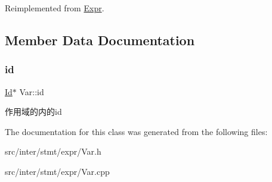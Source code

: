 Reimplemented from \hyperlink{class_expr}{Expr}.



\subsection{Member Data Documentation}
\mbox{\label{class_var_a3e5c7c9425da4659290da5c0553c7dc6}} 
\subsubsection{\texorpdfstring{id}{id}}
{\footnotesize\ttfamily \hyperlink{class_id}{Id}$\ast$ Var\+::id}

作用域的内的id 

The documentation for this class was generated from the following files\+:\begin{DoxyCompactItemize}
\item 
src/inter/stmt/expr/Var.\+h\item 
src/inter/stmt/expr/Var.\+cpp\end{DoxyCompactItemize}
